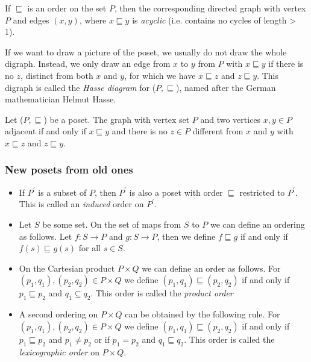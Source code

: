 If $ \sqsubseteq $ is an order on the set $P$, then the corresponding directed
graph with vertex $P$ and edges $ (x,y) $, where $ x \sqsubseteq y $ is \emph{acyclic}
(i.e. contains no cycles of length > 1).

If we want to draw a picture of the poset, we usually do not draw the whole digraph.
Instead, we only draw an edge from $x$ to $y$ from $P$ with $ x \sqsubseteq y $ if
there is no $z$, distinct from both $x$ and $y$, for which we have $ x \sqsubseteq z $
and $ z \sqsubseteq y $. This digraph is called the \emph{Hasse diagram} for
($P, \sqsubseteq$), named after the German mathematician Helmut Hasse.

\begin{definition}
    Let ($P, \sqsubseteq$) be a poset. The graph with vertex set $P$ and two vertices
    $ x,y \in P $ adjacent if and only if $ x \sqsubseteq y $ and there is no
    $z \in P$ different from $x$ and $y$ with $x \sqsubseteq z$ and $z \sqsubseteq y$.
\end{definition}

\subsubsection{New posets from old ones}
\begin{itemize}
    \item If $P^\prime$ is a subset of $P$, then $P^\prime$ is also a poset with
    order $\sqsubseteq$ restricted to $P^\prime$. This is called an \emph{induced}
    order on $P^\prime$.

    \item Let $S$ be some set. On the set of maps from $S$ to $P$ we can define
    an ordering as follows. Let $f : S \to P$ and $g : S \to P$, then we define
    $f \sqsubseteq g$ if and only if $f(s) \sqsubseteq g(s)$ for all $s \in S$.

    \item On the Cartesian product $P \times Q$ we can define an order as follows.
    For $(p_1, q_1), (p_2,q_2) \in P \times Q$ we define $(p_1,q_1) \sqsubseteq (p_2,q_2)$
    if and only if $p_1 \sqsubseteq p_2$ and $q_1 \subseteq q_2$. This order is
    called the \emph{product order}

    \item A second ordering on $P \times Q$ can be obtained by the following rule.
    For $(p_1,q_1), (p_2,q_2) \in P \times Q$ we define $(p_1,q_1) \sqsubseteq (p_2,q_2)$
    if and only if $p_1 \sqsubseteq p_2$ and $p_1 \ne p_2$ or if $p_1 = p_2$
    and $q_1 \sqsubseteq q_2$. This order is called the \emph{lexicographic order}
    on $P \times Q$.
\end{itemize}

